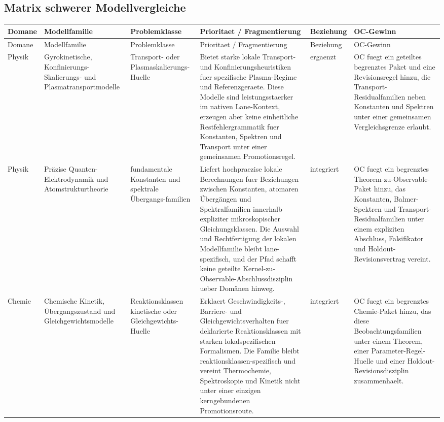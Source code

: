 \subsection{Matrix schwerer Modellvergleiche}
\begin{longtable}{@{}L{0.09\textwidth}L{0.14\textwidth}L{0.12\textwidth}L{0.23\textwidth}L{0.12\textwidth}L{0.22\textwidth}@{}}
\toprule
Domane & Modellfamilie & Problemklasse & Prioritaet / Fragmentierung & Beziehung & OC-Gewinn \\
\midrule
\endfirsthead
\toprule
Domane & Modellfamilie & Problemklasse & Prioritaet / Fragmentierung & Beziehung & OC-Gewinn \\
\midrule
\endhead
Physik & Gyrokinetische, Konfinierungs-Skalierungs- und Plasmatransportmodelle & Transport- oder Plasmaskalierungs-Huelle & Bietet starke lokale Transport- und Konfinierungsheuristiken fuer spezifische Plasma-Regime und Referenzgeraete. \allowbreak Diese Modelle sind leistungsstaerker im nativen Lane-Kontext, erzeugen aber keine einheitliche Restfehlergrammatik fuer Konstanten, Spektren und Transport unter einer gemeinsamen Promotionsregel. & ergaenzt & OC fuegt ein geteiltes begrenztes Paket und eine Revisionsregel hinzu, die Transport-Residualfamilien neben Konstanten und Spektren unter einer gemeinsamen Vergleichsgrenze erlaubt. \\
Physik & Präzise Quanten-Elektrodynamik und Atomstrukturtheorie & fundamentale Konstanten und spektrale Übergangs-familien & Liefert hochpraezise lokale Berechnungen fuer Beziehungen zwischen Konstanten, atomaren Übergängen und Spektralfamilien innerhalb expliziter mikroskopischer Gleichungsklassen. \allowbreak Die Auswahl und Rechtfertigung der lokalen Modellfamilie bleibt lane-spezifisch, und der Pfad schafft keine geteilte Kernel-zu-Observable-Abschlussdisziplin ueber Domänen hinweg. & integriert & OC fuegt ein begrenztes Theorem-zu-Observable-Paket hinzu, das Konstanten, Balmer-Spektren und Transport-Residualfamilien unter einem expliziten Abschluss, Falsifikator und Holdout-Revisionsvertrag vereint. \\
Chemie & Chemische Kinetik, Übergangszustand und Gleichgewichtsmodelle & Reaktionsklassen kinetische oder Gleichgewichts-Huelle & Erklaert Geschwindigkeits-, Barriere- und Gleichgewichtsverhalten fuer deklarierte Reaktionsklassen mit starken lokalspezifischen Formalismen. \allowbreak Die Familie bleibt reaktionsklassen-spezifisch und vereint Thermochemie, Spektroskopie und Kinetik nicht unter einer einzigen kerngebundenen Promotionsroute. & integriert & OC fuegt ein begrenztes Chemie-Paket hinzu, das diese Beobachtungsfamilien unter einem Theorem, einer Parameter-Regel-Huelle und einer Holdout-Revisionsdisziplin zusammenhaelt. \\

\end{longtable}
